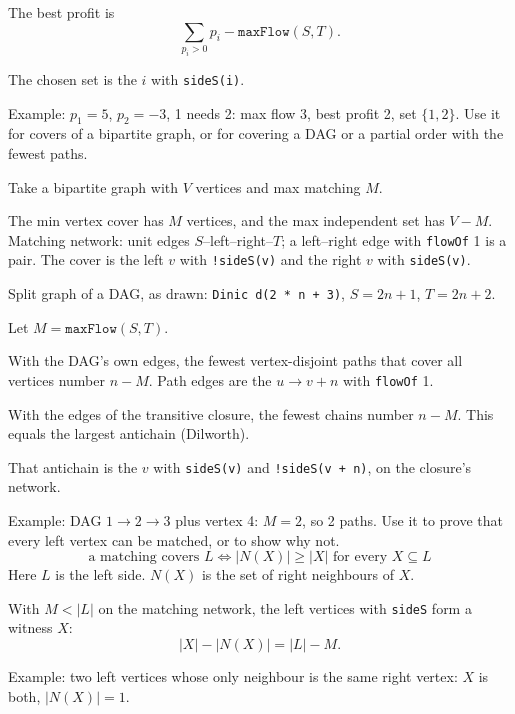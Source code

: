 {
\begin{facts}
	\item The best profit is
	\[ \textstyle\sum_{p_i > 0} p_i - \texttt{maxFlow}(S, T). \]
	\item The chosen set is the $i$ with \texttt{sideS(i)}.
\end{facts}
Example: $p_1 = 5$, $p_2 = -3$, 1 needs 2: max flow 3, best profit 2, set $\{1, 2\}$.
Use it for covers of a bipartite graph, or for covering a DAG or a partial order with the fewest paths.
\begin{facts}
	\item Take a bipartite graph with $V$ vertices and max matching $M$.
	\item The min vertex cover has $M$ vertices, and the max independent set has $V - M$. Matching network: unit edges $S$--left--right--$T$; a left--right edge with \texttt{flowOf} 1 is a pair. The cover is the left $v$ with \texttt{!sideS(v)} and the right $v$ with \texttt{sideS(v)}.
	\item Split graph of a DAG, as drawn: \texttt{Dinic d(2 * n + 3)}, $S = 2n + 1$, $T = 2n + 2$.
	\item Let $M = \texttt{maxFlow}(S, T)$.
	\item With the DAG's own edges, the fewest vertex-disjoint paths that cover all vertices number $n - M$. Path edges are the $u \to v + n$ with \texttt{flowOf} 1.
	\item With the edges of the transitive closure, the fewest chains number $n - M$. This equals the largest antichain (Dilworth).
	\item That antichain is the $v$ with \texttt{sideS(v)} and \texttt{!sideS(v + n)}, on the closure's network.
\end{facts}
Example: DAG $1 \to 2 \to 3$ plus vertex 4: $M = 2$, so 2 paths.
Use it to prove that every left vertex can be matched, or to show why not.
\[ \text{a matching covers } L \iff |N(X)| \ge |X| \text{ for every } X \subseteq L \]
Here $L$ is the left side. $N(X)$ is the set of right neighbours of $X$.
\begin{facts}
	\item With $M < |L|$ on the matching network, the left vertices with \texttt{sideS} form a witness $X$:
	\[ |X| - |N(X)| = |L| - M. \]
\end{facts}
Example: two left vertices whose only neighbour is the same right vertex: $X$ is both, $|N(X)| = 1$.
}
